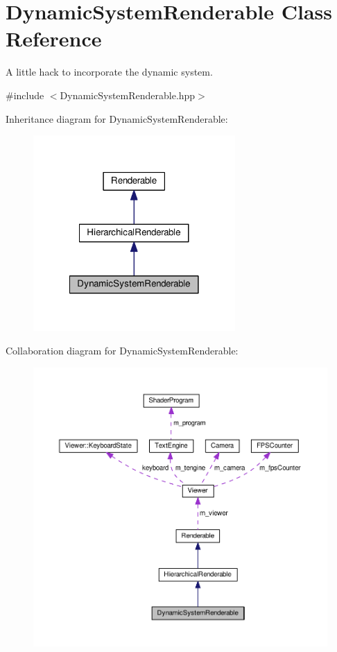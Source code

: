 \hypertarget{classDynamicSystemRenderable}{\section{Dynamic\+System\+Renderable Class Reference}
\label{classDynamicSystemRenderable}
}


A little hack to incorporate the dynamic system.  




{\ttfamily \#include $<$Dynamic\+System\+Renderable.\+hpp$>$}



Inheritance diagram for Dynamic\+System\+Renderable\+:\nopagebreak
\begin{figure}[H]
\begin{center}
\leavevmode
\includegraphics[width=218pt]{classDynamicSystemRenderable__inherit__graph}
\end{center}
\end{figure}


Collaboration diagram for Dynamic\+System\+Renderable\+:\nopagebreak
\begin{figure}[H]
\begin{center}
\leavevmode
\includegraphics[width=350pt]{classDynamicSystemRenderable__coll__graph}
\end{center}
\end{figure}
